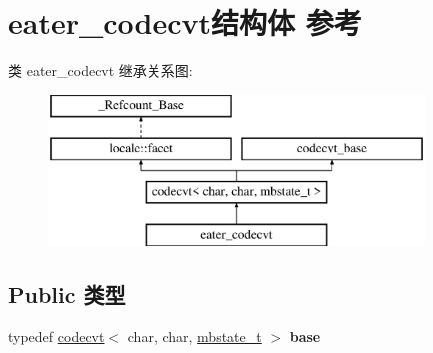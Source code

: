 \hypertarget{structeater__codecvt}{}\section{eater\+\_\+codecvt结构体 参考}
\label{structeater__codecvt}
类 eater\+\_\+codecvt 继承关系图\+:\begin{figure}[H]
\begin{center}
\leavevmode
\includegraphics[height=4.000000cm]{structeater__codecvt}
\end{center}
\end{figure}
\subsection*{Public 类型}
\begin{DoxyCompactItemize}
\item 
\mbox{\label{structeater__codecvt_acbc70429baf1ceaa01cabee339427268}} 
typedef \hyperlink{classcodecvt}{codecvt}$<$ char, char, \hyperlink{struct____mbstate__t}{mbstate\+\_\+t} $>$ {\bfseries base}
\end{DoxyCompactItemize}

